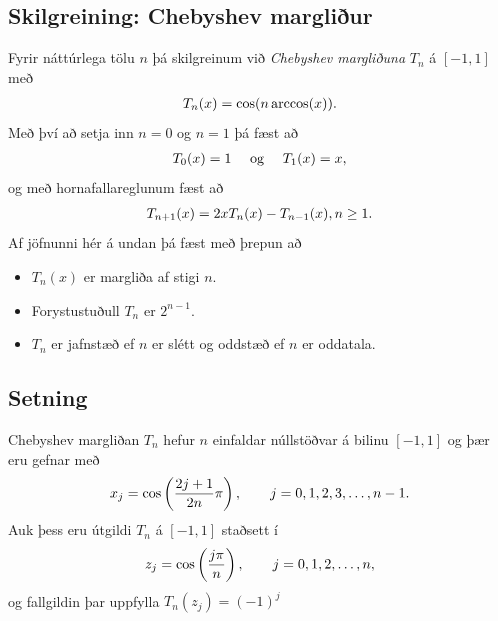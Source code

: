 \documentclass[A4paper,10pt,icelandic]{sphinxmanual}
\begin{document}
\subsection{Skilgreining: Chebyshev margliður}
\label{kafli03:index-15}\label{kafli03:skilgreining-chebyshev-margliur}
Fyrir náttúrlega tölu \(n\) þá skilgreinum við
\emph{Chebyshev margliðuna} \(T_n\) á \([-1,1]\) með
\begin{gather}
\begin{split}T_n(x) = \cos(n \arccos(x)).\end{split}\notag
\end{gather}
Með því að setja inn \(n=0\) og \(n=1\) þá fæst að
\begin{gather}
\begin{split}T_0(x) = 1 \quad \text{ og } \quad T_1(x) = x,\end{split}\notag
\end{gather}
og með hornafallareglunum fæst að
\begin{gather}
\begin{split}T_{n+1}(x) = 2xT_n(x) - T_{n-1}(x), n \geq 1.\end{split}\notag
\end{gather}
Af jöfnunni hér á undan þá fæst með þrepun að
\begin{itemize}
\item {} 
\(T_n(x)\) er margliða af stigi \(n\).

\item {} 
Forystustuðull \(T_n\) er \(2^{n-1}\).

\item {} 
\(T_n\) er jafnstæð ef \(n\) er slétt og oddstæð ef \(n\)
er oddatala.

\end{itemize}


\subsection{Setning}
\label{kafli03:setning}
Chebyshev margliðan \(T_n\) hefur \(n\) einfaldar
núllstöðvar á bilinu \([-1,1]\) og þær eru gefnar með
\begin{gather}
\begin{split}x_j = \cos\left(\frac{2j+1}{2n}\pi\right),\qquad j=0,1,2,3,\ldots,n-1.\end{split}\notag
\end{gather}
Auk þess eru útgildi \(T_n\) á \([-1,1]\) staðsett í
\begin{gather}
\begin{split}z_j = \cos\left( \frac{j\pi}{n}\right),\qquad j=0,1,2,\ldots,n,\end{split}\notag
\end{gather}
og fallgildin þar uppfylla \(T_n(z_j) = (-1)^j\)
\end{document}
